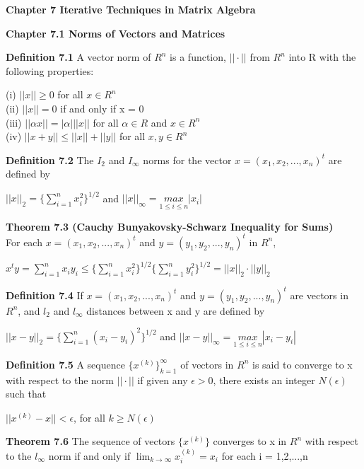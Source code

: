 \documentclass{article}
\begin{document}
\textbf {Chapter 7 Iterative Techniques in Matrix Algebra}

\textbf {Chapter 7.1 Norms of Vectors and Matrices} 

\textbf {Definition 7.1} A vector norm of $R^n$ is a function, $|| \cdot ||$ from $R^n$ into R with the following properties: 
\begin{center}
(i) $||x|| \geq 0$ for all $x \in R^n$ \\
(ii) $|| x || = 0$ if and only if x = 0 \\
(iii) $||\alpha x || = |\alpha| ||x||$ for all $\alpha \in R$ and $x \in R^n$ \\
(iv) $|| x + y || \leq ||x|| + ||y||$ for all $x, y \in R^n$
\end{center}

\textbf {Definition 7.2} The $I_2$ and $I_\infty$ norms for the vector $x = (x_1, x_2,..., x_n)^{t}$ are defined by
\begin{center}
$||x||_2 = {\{ \sum_{i=1}^n x_{i}^{2} \}^{1/2}}$ and $||x||_\infty = {\underset {1 \leq i \leq n}{max} |x_i|}$
\end{center} 

\textbf {Theorem 7.3 (Cauchy Bunyakovsky-Schwarz Inequality for Sums)} \\
For each $x = (x_1 , x_2 ,..., x_n)^{t}$ and $y = (y_1 , y_2, ..., y_n)^{t}$ in $R^n$,
\begin{center}
$x^{t} y = \sum_{i=1}^n x_i y_i \leq \{\sum_{i=1}^n x_{i}^2\}^{1/2} \{\sum_{i=1}^n y_{i}^2 \}^{1/2} = ||x||_2 \cdot ||y||_2$
\end{center}

\textbf {Definition 7.4} If $x = (x_1, x_2,...,x_n)^{t}$ and $y = (y_1, y_2 ,..., y_n)^{t}$ are vectors in $R^n$, and $l_2$ and $l_\infty$ distances between x and y are defined by 
\begin{center}
$||x-y||_2 = \{ \sum_{i=1}^n (x_i - y_i)^2 \}^{1/2}$ and $||x-y||_\infty = \underset {1 \leq i \leq n}{max} |x_i - y_i|$
\end{center}

\textbf {Definition 7.5} A sequence $\{x^{(k)}\}_{k=1}^\infty$ of vectors in $R^n$ is said to converge to x with respect to the norm $||\cdot||$ if given any $\epsilon > 0$, there exists an integer $N(\epsilon)$ such that

\begin{center}
$||x^{(k)} - x || < \epsilon$, for all $k \geq N(\epsilon)$
\end{center}

\textbf {Theorem 7.6} The sequence of vectors $\{x^{(k)}\}$ converges to x in $R^n$ with respect to the $l_\infty$ norm if and only if $\lim_{k \to \infty} x_i^{(k)} = x_i$ for each i = 1,2,...,n
\end{document}
